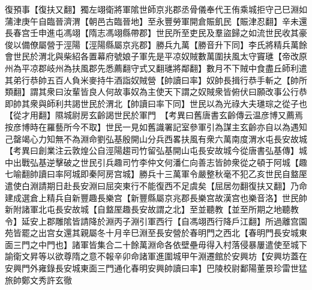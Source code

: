 復預事【復扶又翻】獨左翊衛將軍隂世師京兆郡丞骨儀奉代王侑乘城拒守己巳淵如蒲津庚午自臨晉濟渭【朝邑古臨晉地】至永豐勞軍開倉賑飢民【賑津忍翻】辛未還長春宫壬申進屯馮翊【隋志馮翊縣帶郡】世民所至吏民及羣盜歸之如流世民收其豪俊以備僚屬營于涇陽【涇陽縣屬京兆郡】勝兵九萬【勝音升下同】李氏將精兵萬餘會世民於渭北與柴紹各置幕府號娘子軍先是平凉奴賊數萬圍扶風太守竇璡【帝改原州為平凉郡岐州為扶風郡先悉薦翻守式又翻璡將鄰翻】數月不下賊中食盡丘師利遣其弟行恭帥五百人負米麥持牛酒詣奴賊營【帥讀曰率】奴帥長揖行恭手斬之【帥所類翻】謂其衆曰汝輩皆良人何故事奴為主使天下謂之奴賊衆皆俯伏曰願改事公行恭即帥其衆與師利共謁世民於渭北【帥讀曰率下同】世民以為光祿大夫璡琮之從子也【從才用翻】隰城尉房玄齡謁世民於軍門　【考異曰舊唐書玄齡傳云温彦博又薦焉按彦博時在羅藝所今不取】世民一見如舊識署記室參軍引為謀主玄齡亦自以為遇知己罄竭心力知無不為淵命劉弘基殷開山分兵西畧扶風有衆六萬南度渭水屯長安故城【考異曰創業注云敦煌公自涇陽趨司竹留弘基開山屯長安故城今從唐書弘基傳】城中出戰弘基逆擊破之世民引兵趣司竹李仲文何潘仁向善志皆帥衆從之頓于阿城【趣七喻翻帥讀曰率阿城即秦阿房宫城】勝兵十三萬軍令嚴整秋毫不犯乙亥世民自盩厔遣使白淵請期日赴長安淵曰屈突東行不能復西不足虞矣【屈居勿翻復扶又翻】乃命建成選倉上精兵自新豐趣長樂宫【新豐縣屬京兆郡長樂宫故漢宫也樂音洛】世民帥新附諸軍北屯長安故城【自盩厔趣長安故謂之北】至並聽教【並至所期之地聽教令】延安上郡雕隂皆請降於淵丙子淵引軍西行【自馮翊西行降戶江翻】所過離宫園苑皆罷之出宫女還其親屬冬十月辛巳淵至長安營於春明門之西北【春明門長安城東面三門之中門也】諸軍皆集合二十餘萬淵命各依壁壘毋得入村落侵暴屢遣使至城下諭衛文昇等以欲尊隋之意不報辛卯命諸軍進圍城甲午淵遷館於安興坊【安興坊蓋在安興門外雍錄長安城東面三門通化春明安興帥讀曰率】巴陵校尉鄱陽董景珍雷世猛旅帥鄭文秀許玄徹

